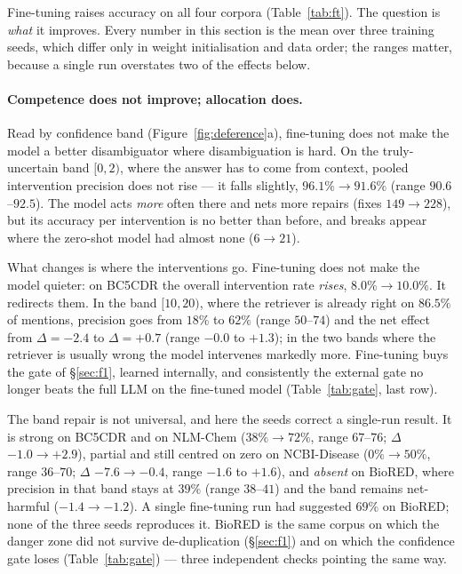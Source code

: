 \documentclass[11pt]{article}
\begin{document}
Fine-tuning raises accuracy on all four corpora (Table~\ref{tab:ft}). The question is
\emph{what} it improves. Every number in this section is the mean over three training
seeds, which differ only in weight initialisation and data order; the ranges matter,
because a single run overstates two of the effects below.

\paragraph{Competence does not improve; allocation does.}
Read by confidence band (Figure~\ref{fig:deference}a), fine-tuning does not make the
model a better disambiguator where disambiguation is hard. On the truly-uncertain band
$[0,2)$, where the answer has to come from context, pooled intervention precision does
not rise --- it falls slightly, $96.1\% \to 91.6\%$ (range $90.6$--$92.5$). The model
acts \emph{more} often there and nets more repairs (fixes $149 \to 228$), but its
accuracy per intervention is no better than before, and breaks appear where the
zero-shot model had almost none ($6 \to 21$).

What changes is where the interventions go. Fine-tuning does not make the model quieter:
on BC5CDR the overall intervention rate \emph{rises}, $8.0\% \to 10.0\%$. It redirects
them. In the band $[10,20)$, where the retriever is already right on $86.5\%$ of
mentions, precision goes from $18\%$ to $62\%$ (range $50$--$74$) and the net effect
from $\Delta = -2.4$ to $\Delta = +0.7$ (range $-0.0$ to $+1.3$); in the two bands where
the retriever is usually wrong the model intervenes markedly more. Fine-tuning buys the
gate of \S\ref{sec:f1}, learned internally, and consistently the external gate no longer
beats the full LLM on the fine-tuned model (Table~\ref{tab:gate}, last row).

The band repair is not universal, and here the seeds correct a single-run result. It is
strong on BC5CDR and on NLM-Chem ($38\% \to 72\%$, range $67$--$76$; $\Delta$ $-1.0 \to
+2.9$), partial and still centred on zero on NCBI-Disease ($0\% \to 50\%$, range
$36$--$70$; $\Delta$ $-7.6 \to -0.4$, range $-1.6$ to $+1.6$), and \emph{absent} on
BioRED, where precision in that band stays at $39\%$ (range $38$--$41$) and the band
remains net-harmful ($-1.4 \to -1.2$). A single fine-tuning run had suggested $69\%$ on
BioRED; none of the three seeds reproduces it. BioRED is the same corpus on which the
danger zone did not survive de-duplication (\S\ref{sec:f1}) and on which the confidence
gate loses (Table~\ref{tab:gate}) --- three independent checks pointing the same way.
\end{document}
